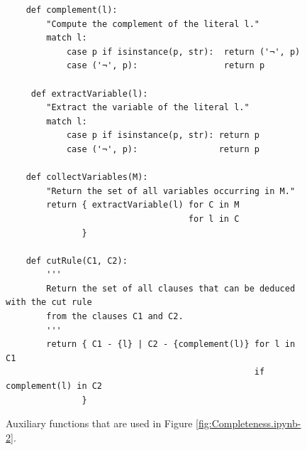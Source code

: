 \begin{figure}[!ht]
\centering
\begin{verbatim}
    def complement(l):
        "Compute the complement of the literal l."
        match l:
            case p if isinstance(p, str):  return ('¬', p)
            case ('¬', p):                 return p

     def extractVariable(l):
        "Extract the variable of the literal l."
        match l:
            case p if isinstance(p, str): return p           
            case ('¬', p):                return p
    
    def collectVariables(M):
        "Return the set of all variables occurring in M."
        return { extractVariable(l) for C in M 
                                    for l in C
               }        
        
    def cutRule(C1, C2):
        '''
        Return the set of all clauses that can be deduced with the cut rule 
        from the clauses C1 and C2.
        '''
        return { C1 - {l} | C2 - {complement(l)} for l in C1
                                                 if  complement(l) in C2
               }
\end{verbatim}
\vspace*{-0.3cm}
\caption{Auxiliary functions that are used in Figure \ref{fig:Completeness.ipynb-2}.}
\label{fig:Completeness.ipynb-1}
\end{figure}

